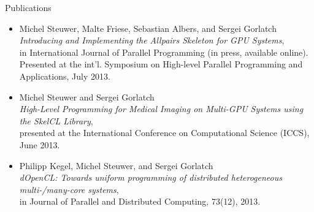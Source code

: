 \documentclass[letterpaper]{resume} %
\begin{document}
\begin{rSection}{Publications %
  }

\begin{itemize}

  \item Michel Steuwer, Malte Friese, Sebastian Albers, and Sergei Gorlatch\\
    \emph{Introducing and Implementing the Allpairs Skeleton for GPU Systems},\\
    in International Journal of Parallel Programming (in press, available
    online).\\
    Presented at the int'l. Symposium on High-level Parallel Programming and Applications, July 2013.

  \item Michel Steuwer and Sergei Gorlatch\\
    \emph{High-Level Programming for Medical Imaging on Multi-GPU Systems using
      the SkelCL Library},\\
    presented at the International Conference on Computational Science (ICCS),
    June 2013.

  \item Philipp Kegel, Michel Steuwer, and Sergei Gorlatch\\
    \emph{dOpenCL: Towards uniform programming of distributed heterogeneous
      multi-/many-core systems},\\
    in Journal of Parallel and Distributed Computing, 73(12), 2013.


\end{itemize}
\end{rSection}
\end{document}
